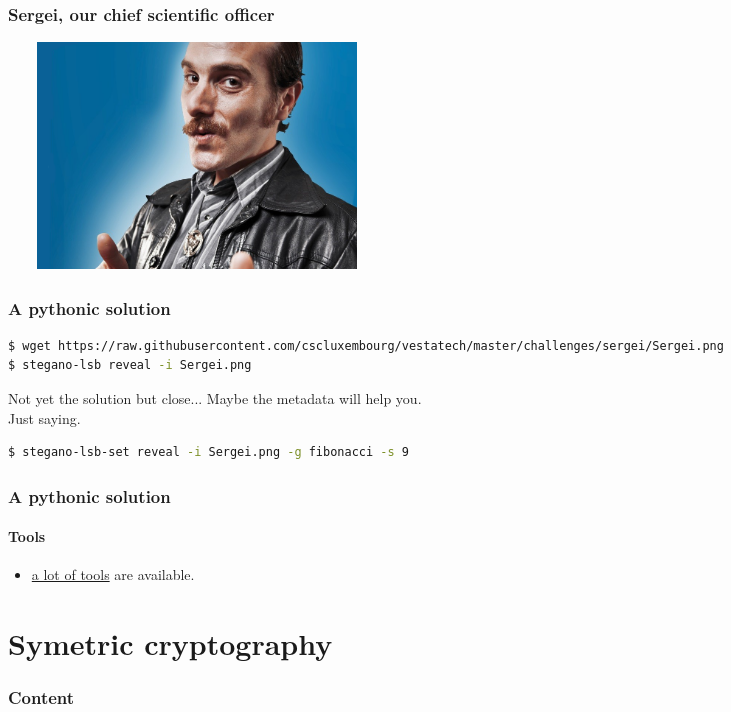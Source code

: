 \documentclass[]{beamer}
\begin{document}
\begin{frame}
\frametitle{Sergei, our chief scientific officer}
\begin{center}
    \includegraphics[height=6.0cm, width=10.0cm]{./images/Sergei.png}
\end{center}
\end{frame}

\begin{frame}[fragile]
\frametitle{A pythonic solution}
\begin{lstlisting}[language=Bash]
$ wget https://raw.githubusercontent.com/cscluxembourg/vestatech/master/challenges/sergei/Sergei.png
$ stegano-lsb reveal -i Sergei.png
\end{lstlisting}
Not yet the solution but close... Maybe the metadata will help you.\\Just saying.
\bigskip

\begin{lstlisting}[language=Bash]
$ stegano-lsb-set reveal -i Sergei.png -g fibonacci -s 9
\end{lstlisting}
\end{frame}


\begin{frame}
\frametitle{A pythonic solution}
\framesubtitle{Tools}
\begin{itemize}
    \item \href{https://github.com/topics/steganography}{a lot of tools} are available.
\end{itemize}
\end{frame}



%
%
\section{Symetric cryptography}
\begin{frame}
    \frametitle{Content}
    \begin{columns}[t]
        \begin{column}{5cm}
            \tableofcontents[sections={1-3}, currentsection, hideothersubsections]
        \end{column}
        \begin{column}{5cm}
            \tableofcontents[sections={4-5}, currentsection, hideothersubsections]
        \end{column}
    \end{columns}
\end{frame}
\end{document}
